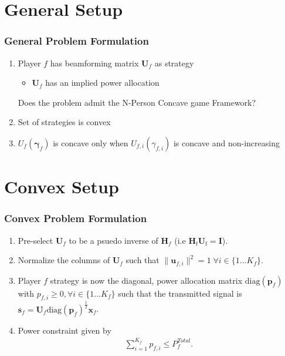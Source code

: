\documentclass[10pt,tgadventor, onlymath]{beamer}
\begin{document}
\section{General Setup}

\begin{frame}

\frametitle{General Problem Formulation}
\begin{enumerate}
\setlength\itemsep{2em}

\item  Player $f$ has beamforming matrix $\mathbf{U}_f$ as strategy
\begin{itemize}
\item $\mathbf{U}_f$ has an implied power allocation
\end{itemize}
\pause
Does the problem admit the N-Person Concave game Framework? 

\item  Set of strategies is convex \faThumbsOUp
\pause
\item  $U_{f}(\boldsymbol{\gamma}_{f})$ is concave only when $U_{f,i}(\gamma_{f,i})$ is concave and non-increasing 
\faThumbsODown
\end{enumerate}
\end{frame}

\section{Convex Setup}

\begin{frame}
\frametitle{Convex Problem Formulation}
\begin{enumerate}
\setlength\itemsep{2em}
\item Pre-select $\mathbf{U}_f$ to be a psuedo inverse of $\mathbf{H}_f$  (i.e $\mathbf{H}_\mathrm{f}\mathbf{U}_\mathrm{f} = \mathbf{I}$).
\item 
	Normalize the columns of $\mathbf{U}_{f}$ such that 
	 $\|\mathbf{u}_{f,i}\|^2 =1 \;\forall i \in \{1 ... K_{f}\}$.
\item 
	Player $f$ strategy is now the diagonal, power allocation  	
	matrix $\mathrm{diag}(\mathbf{p}_{f})$ with $p_{f,i} \geq 0, \forall i \in \{1 ... K_{f}\}$
such that the transmitted 		
	signal is 
	$\mathbf{s}_{f	}= \mathbf{U}_{f} 
	\mathrm{diag}(\mathbf{p}_{f})^{\frac{1}{2}}
	\mathbf{x}_{f}$.
\item 
	Power constraint given by 
	\begin{gather*}
	\sum_{i=1}^{K_{f}} p_{f,i}
	  \leq P^{Total}_{f}.
	  	\end{gather*}
\end{enumerate}
\end{frame}
\end{document}
